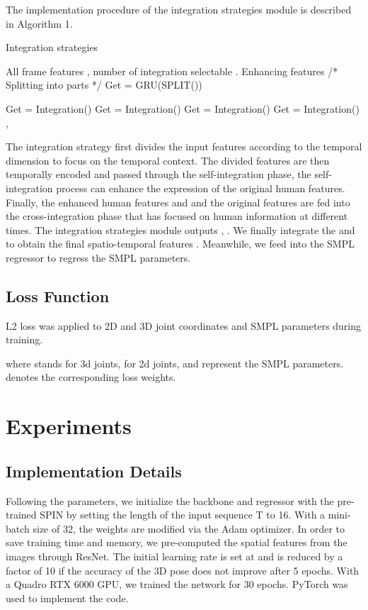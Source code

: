 \documentclass{bmvc2k}
\begin{document}
The implementation procedure of the integration strategies module is described in Algorithm 1. 
\begin{algorithm} 
	\caption{Integration strategies}     \label{xx}       \begin{algorithmic}[1] \Require All frame features , number of integration selectable .   \Ensure  Enhancing features    \State /* Splitting  into  parts */    \State  Get  = GRU(SPLIT())    

        \For {}
      \State  Get  = Integration()
      \State  Get  = Integration()
    \EndFor
  \State Get  = Integration()
  \State Get  = Integration()
  \State\Return ,  \end{algorithmic} 
\end{algorithm}
The integration strategy first divides the input features according to the temporal dimension to focus on the temporal context. The divided features are then temporally encoded and passed through the self-integration phase, the self-integration process can enhance the expression of the original human features. Finally, the enhanced human features  and  and the original features  are fed into the cross-integration phase that has focused on human information at different times. The integration strategies module outputs , .
We finally integrate the  and  to obtain the final spatio-temporal features . Meanwhile, we feed  into the SMPL regressor to regress the SMPL parameters.






\subsection{Loss Function}
L2 loss was applied to 2D and 3D joint coordinates and SMPL parameters during training.

where  stands for 3d joints,  for 2d joints,  and  represent the SMPL parameters.  denotes the corresponding loss weights.

\section{Experiments}
\subsection{Implementation Details}
Following the \cite{choi2021beyond} parameters, we initialize the backbone and regressor with the pre-trained SPIN by setting the length of the input sequence T to 16. With a mini-batch size of 32, the weights are modified via the Adam optimizer. 
In order to save training time and memory, we pre-computed the spatial features from the images through ResNet. The initial learning rate is set at  and is reduced by a factor of 10 if the accuracy of the 3D pose does not improve after 5 epochs. With a Quadro RTX 6000 GPU, we trained the network for 30 epochs. PyTorch was used to implement the code.
\end{document}
